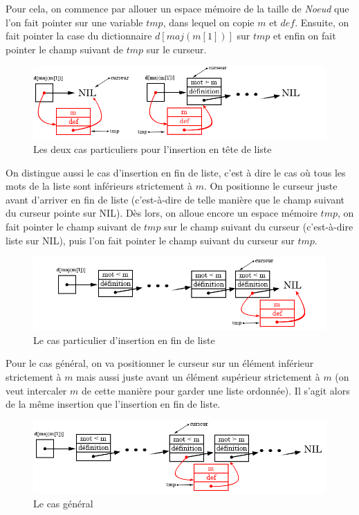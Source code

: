 \documentclass[a4paper, titlepage]{livret} %
\begin{document}
					Pour cela, on commence par allouer un espace mémoire de la taille de \textit{Noeud} que l'on fait pointer sur une variable $tmp$, dans lequel on copie $m$ et $def$.
					Ensuite, on fait pointer la case du dictionnaire $d[maj(m[1])]$ sur $tmp$ et enfin on fait pointer le champ suivant de $tmp$ sur le curseur.
					\begin{figure}[!ht]
					\centering
  						\includegraphics[scale=0.45]{inserer1.png}
  						\caption{Les deux cas particuliers pour l'insertion en tête de liste} 
					\end{figure}

					On distingue aussi le cas d'insertion en fin de liste, c'est à dire le cas où tous les mots de la liste sont inférieurs strictement à $m$.
					On positionne le curseur juste avant d'arriver en fin de liste (c'est-à-dire de telle manière que le champ suivant du curseur pointe sur NIL).
					Dès lors, on alloue encore un espace mémoire $tmp$, on fait pointer le champ suivant de $tmp$ sur le champ suivant du curseur (c'est-à-dire  liste sur NIL), puis l'on fait pointer le champ suivant du curseur sur $tmp$.
					\begin{figure}[!ht]
					\centering
  						\includegraphics[scale=0.45]{inserer2.png}
  						\caption{Le cas particulier d'insertion en fin de liste} 
					\end{figure}

					Pour le cas général, on va positionner le curseur sur un élément inférieur strictement à $m$ mais aussi juste avant un élément supérieur strictement à $m$ (on veut \og intercaler \fg{} $m$ de cette manière pour garder une liste ordonnée).
					Il s'agit alors de la même insertion que l'insertion en fin de liste.
					\begin{figure}[!ht]
					\centering
  						\includegraphics[scale=0.45]{inserer3.png}
  						\caption{Le cas général} 
					\end{figure}\\
\end{document}
